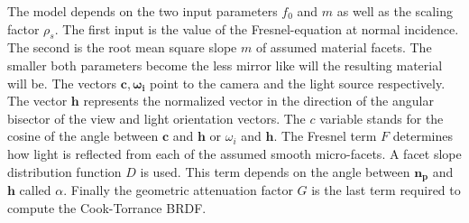 The model depends on the two input parameters $f_0$ and $m$ as well as the scaling factor $\rho_s$. The first input is the value of the Fresnel-equation at normal incidence. The second is the root mean square slope $m$ of assumed material facets. The smaller both parameters become the less mirror like will the resulting material will be. The vectors $\mathbf{c,\omega_i}$ point to the camera and the light source respectively.
The vector $\mathbf{h}$ represents the normalized vector in the direction of the angular bisector of the view and light orientation vectors.
The $c$ variable stands for the cosine of the angle between $\mathbf{c}$ and $\mathbf{h}$ or $\omega_i$ and $\mathbf{h}$. 
The Fresnel term $F$ determines how light is reflected from each of the assumed smooth micro-facets. 
A facet slope distribution function $D$ is used. This term depends on the angle between $\mathbf{n_p}$ and $\mathbf{h}$ called $\alpha$.
Finally the geometric attenuation factor $G$ is the last term required to compute the Cook-Torrance BRDF.

